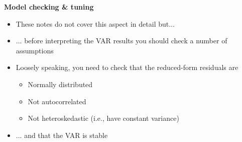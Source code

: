 \documentclass[10pt,english,t,aspectratio=169,ignorenonframetext]{beamer}
\begin{document}

\begin{frame}
{\textbf{Model checking \& tuning}}\bigskip \medskip

\begin{itemize}
\item These notes do not cover this aspect in detail but... \bigskip

\item ... before interpreting the VAR results you should check a number of
assumptions\bigskip \pause

\item Loosely speaking, you need to check that the reduced-form residuals
are\smallskip

\begin{itemize}
\item Normally distributed\medskip

\item Not autocorrelated\medskip

\item Not heteroskedastic (i.e., have constant variance)\bigskip \pause
\end{itemize}

\item ... and that the VAR is stable
\end{itemize}
\end{frame}

\end{document}
